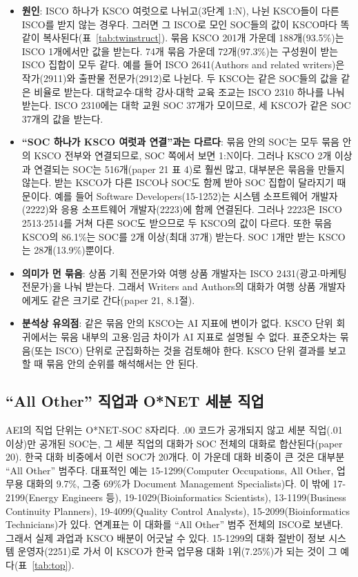 \documentclass[11pt]{article}
\begin{document}
\begin{itemize}[leftmargin=*]
  \item \textbf{원인}: ISCO 하나가 KSCO 여럿으로 나뉘고(3단계 1:N), 나뉜 KSCO들이 다른 ISCO를 받지 않는 경우다. 그러면 그 ISCO로 모인 SOC들의 값이 KSCO마다 똑같이 복사된다(표~\ref{tab:twinstruct}). 묶음 KSCO 201개 가운데 188개(93.5\%)는 ISCO 1개에서만 값을 받는다. 74개 묶음 가운데 72개(97.3\%)는 구성원이 받는 ISCO 집합이 모두 같다. 예를 들어 ISCO 2641(Authors and related writers)은 작가(2911)와 출판물 전문가(2912)로 나뉜다. 두 KSCO는 같은 SOC들의 값을 같은 비율로 받는다. 대학교수$\cdot$대학 강사$\cdot$대학 교육 조교는 ISCO 2310 하나를 나눠 받는다. ISCO 2310에는 대학 교원 SOC 37개가 모이므로, 세 KSCO가 같은 SOC 37개의 값을 받는다.
  \item \textbf{``SOC 하나가 KSCO 여럿과 연결''과는 다르다}: 묶음 안의 SOC는 모두 묶음 안의 KSCO 전부와 연결되므로, SOC 쪽에서 보면 1:N이다. 그러나 KSCO 2개 이상과 연결되는 SOC는 516개(paper 21 표 4)로 훨씬 많고, 대부분은 묶음을 만들지 않는다. 받는 KSCO가 다른 ISCO나 SOC도 함께 받아 SOC 집합이 달라지기 때문이다. 예를 들어 Software Developers(15-1252)는 시스템 소프트웨어 개발자(2222)와 응용 소프트웨어 개발자(2223)에 함께 연결된다. 그러나 2223은 ISCO 2513$\cdot$2514를 거쳐 다른 SOC도 받으므로 두 KSCO의 값이 다르다. 또한 묶음 KSCO의 86.1\%는 SOC를 2개 이상(최대 37개) 받는다. SOC 1개만 받는 KSCO는 28개(13.9\%)뿐이다.
  \item \textbf{의미가 먼 묶음}: 상품 기획 전문가와 여행 상품 개발자는 ISCO 2431(광고$\cdot$마케팅 전문가)을 나눠 받는다. 그래서 Writers and Authors의 대화가 여행 상품 개발자에게도 같은 크기로 간다(paper 21, 8.1절).
  \item \textbf{분석상 유의점}: 같은 묶음 안의 KSCO는 AI 지표에 변이가 없다. KSCO 단위 회귀에서는 묶음 내부의 고용$\cdot$임금 차이가 AI 지표로 설명될 수 없다. 표준오차는 묶음(또는 ISCO) 단위로 군집화하는 것을 검토해야 한다. KSCO 단위 결과를 보고할 때 묶음 안의 순위를 해석해서는 안 된다.
\end{itemize}

\subsection{``All Other'' 직업과 O*NET 세분 직업}

AEI의 직업 단위는 O*NET-SOC 8자리다. .00 코드가 공개되지 않고 세분 직업(.01 이상)만 공개된 SOC는, 그 세분 직업의 대화가 SOC 전체의 대화로 합산된다(paper 20). 한국 대화 비중에서 이런 SOC가 20개다. 이 가운데 대화 비중이 큰 것은 대부분 ``All Other'' 범주다. 대표적인 예는 15-1299(Computer Occupations, All Other, 업무용 대화의 9.7\%, 그중 69\%가 Document Management Specialists)다. 이 밖에 17-2199(Energy Engineers 등), 19-1029(Bioinformatics Scientists), 13-1199(Business Continuity Planners), 19-4099(Quality Control Analysts), 15-2099(Bioinformatics Technicians)가 있다. 연계표는 이 대화를 ``All Other'' 범주 전체의 ISCO로 보낸다. 그래서 실제 과업과 KSCO 배분이 어긋날 수 있다. 15-1299의 대화 절반이 정보 시스템 운영자(2251)로 가서 이 KSCO가 한국 업무용 대화 1위(7.25\%)가 되는 것이 그 예다(표~\ref{tab:top}).
\end{document}
